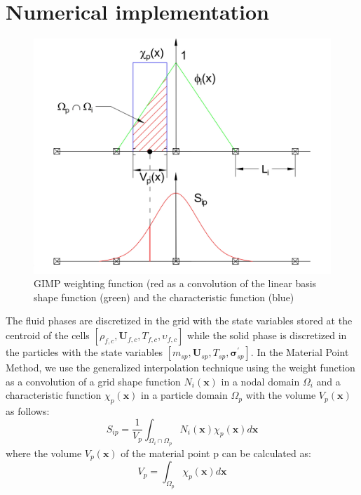 \documentclass[preprint,12pt]{elsarticle}
\begin{document}
\section{\textsf{Numerical implementation}}
\label{Discretization}
%
%
\begin{figure}[H]
\center
\includegraphics[scale=.5]{GIMPshape.jpg}
\caption{GIMP weighting function (red as a convolution of the linear basis shape function (green) and the characteristic function (blue)}
\label{fig:GIMP}
\end {figure}
%
The fluid phases are discretized in the grid with the state variables stored at the centroid of the cells $[\rho_{f,c},\pmb{U}_{f,c},T_{f,c},\upsilon_{f,c}]$ while the solid phase is discretized in the particles with the state variables $[m_{sp},\pmb{U}_{sp},T_{sp},\pmb{\sigma}^\prime_{sp}]$. In the Material Point Method, we use the generalized interpolation technique \cite{GIMP} using the weight function as a convolution of a grid shape function $N_i(\pmb{x})$ in a nodal domain $\Omega_i$ and a characteristic function $\chi_p (\pmb{x})$ in a particle domain $\Omega_p$ with the volume $V_p (\pmb{x})$ as follows:
%
%
\begin{equation}
     S_{ip} = \frac {1}{V_p} \int_{\Omega_i \cap \Omega_p} N_i(\pmb{x}) \chi_p (\pmb{x}) d\pmb{x}
\end {equation}
%
%
where the volume $V_p (\pmb{x})$ of the material point p can be calculated as:
%
%
\begin{equation}
     V_{p} = \int_{\Omega_p} \chi_p (\pmb{x}) d\pmb{x}
\end {equation}
\end{document}
